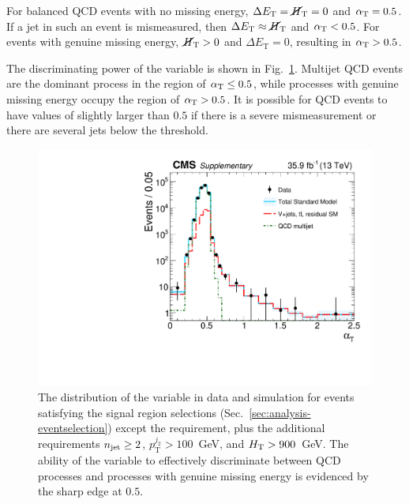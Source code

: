 For balanced QCD events with no missing energy, $\Delta E_\mathrm T = \mbox{$\cancel{H}_\text{T}$} = 0$ 
and $\alpha_{\text{T}} = 0.5$. If a jet in such an event is mismeasured, then $\Delta 
E_\mathrm T \approx \mbox{$\cancel{H}_\text{T}$}$ and $\alpha_{\text{T}} < 0.5$. For events with genuine missing 
energy, $\mbox{$\cancel{H}_\text{T}$} > 0$ and $\Delta E_\mathrm T = 0$, resulting in $\alpha_{\text{T}} > 0.5$.

The discriminating power of the \alphat variable is shown in 
Fig.~\ref{fig:alphat}. Multijet QCD events are the dominant process in the 
region of $\alpha_{\text{T}} \leq 0.5$, while processes with genuine missing energy 
occupy the region of $\alpha_{\text{T}} > 0.5$. It is possible for QCD events to have 
values of \alphat slightly larger than $0.5$ if there is a severe 
mismeasurement or there are several jets below the \pt threshold.




\begin{figure}[t!]
\begin{center}
\includegraphics[width=0.7\linewidth]{figs/analysis/propaganda_alphat_180210}
\caption{The distribution of the \alphat variable in data and simulation for 
events satisfying the signal region selections 
(Sec.~\ref{sec:analysis-eventselection}) except the \alphat requirement, plus 
the additional requirements $n_{\text{jet}} \geq 2$, $p_{\mathrm{T}}^{j_2} > 
100$~GeV, and $\mbox{$H_\text{T}$} > 900$~GeV. The 
ability of the variable to effectively discriminate between QCD processes and 
processes with genuine missing energy is evidenced by the sharp edge at $0.5$.} 
\label{fig:alphat}
\end{center}
\end{figure}

